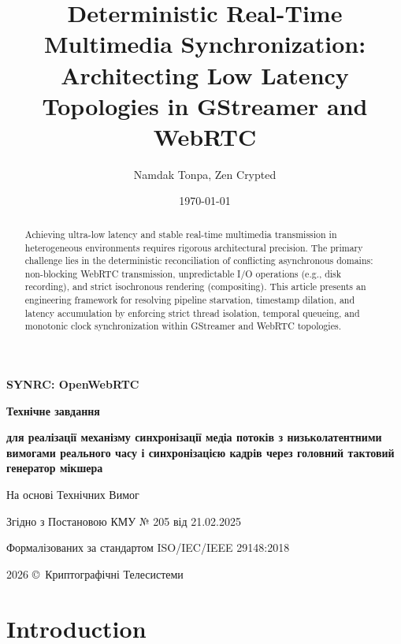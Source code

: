 \documentclass{article}
\title{Deterministic Real-Time Multimedia Synchronization: Architecting Low Latency Topologies in GStreamer and WebRTC}
\author{Namdak Tonpa, Zen Crypted}
\date{\today}
\newcommand\HUGE[1]{\fontsize{40}{40}\selectfont #1}
\begin{document}
\begin{titlepage}
  \AddToShipoutPictureBG*{\AtPageLowerLeft{\color{nato}\rule{\paperwidth}{\paperheight}}}
  \color{white}\thispagestyle{empty}\vspace*{3cm}\centering
  {\Huge  \textbf{SYNRC: OpenWebRTC} \par} \vspace{1.5cm}
  {\HUGE  \textbf{Технічне завдання} \par} \vspace{1.5cm}
  {\LARGE \textbf{для реалізації механізму синхронізації медіа потоків
                  з низьколатентними вимогами реального часу
                  і синхронізацією кадрів через головний тактовий генератор мікшера
                  } \par} \vspace{1.5cm}
  {\large На основі Технічних Вимог \par}
  {\large Згідно з Постановою КМУ № 205 від 21.02.2025 \par}
  {\large Формалізованих за стандартом ISO/IEC/IEEE 29148:2018 \par}
  \vfill
  {\large 2026 \copyright\ Криптографічні Телесистеми \par}
\end{titlepage}

\newpage
\maketitle

\begin{abstract}
Achieving ultra-low latency and stable real-time multimedia transmission in heterogeneous
environments requires rigorous architectural precision. The primary challenge lies in the
deterministic reconciliation of conflicting asynchronous domains: non-blocking WebRTC transmission,
unpredictable I/O operations (e.g., disk recording), and strict isochronous rendering (compositing).
This article presents an engineering framework for resolving pipeline starvation, timestamp dilation,
and latency accumulation by enforcing strict thread isolation, temporal queueing, and monotonic clock
synchronization within GStreamer and WebRTC topologies.
\end{abstract}


\tableofcontents

\newpage
\section{Introduction}
\end{document}
